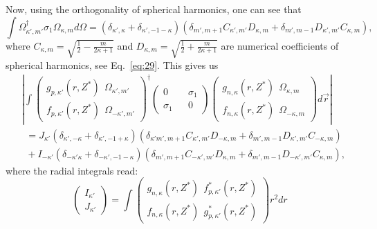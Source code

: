   Now, using the orthogonality of spherical harmonics, one can
  see that
  \begin{equation}
    \int\Omega^{\dagger}_{\kappa',m'}\sigma_1\Omega_{\kappa,m}
    d\Omega=(\delta_{\kappa',\kappa} + \delta_{\kappa',-1-\kappa})
    (\delta_{m',m+1} C_{\kappa',m'} D_{\kappa,m} + \delta_{m',m-1}
    D_{\kappa',m'}C_{\kappa,m}),
  \end{equation}
  where $C_{\kappa,m}= \sqrt{\frac{1}{2} - \frac{m}{2\kappa+1}}$ and
  $D_{\kappa,m} = \sqrt{\frac{1}{2} + \frac{m}{2\kappa+1}}$ are
  numerical coefficients of spherical harmonics, see
  Eq.~\eqref{eq:29}. This gives us
  \begin{align}
    &\left|\int\left(\begin{matrix}
          g_{p,\kappa'}(r,Z^*)~~ \Omega_{\kappa',m'}
          \\
          f_{p,\kappa'}(r,Z^*)~~\Omega_{-\kappa',m'}
        \end{matrix}\right)^{\dagger}\left(\begin{matrix}
          0&&\sigma_1
          \\
          \sigma_1&&0
        \end{matrix}\right)\left(\begin{matrix}
          g_{n,\kappa}(r,Z^*)~~ \Omega_{\kappa,m}
          \\
          f_{n,\kappa}(r,Z^*)~~\Omega_{-\kappa,m}
        \end{matrix}\right)d\vec{r}\right| \nonumber 
    \\
    &~~=J_{\kappa'}(\delta_{\kappa',-\kappa} +
      \delta_{\kappa',-1+\kappa}) (\delta_{\kappa'm',m+1}
      C_{\kappa',m'} D_{-\kappa,m} + \delta_{m',m-1} D_{\kappa',m'}
      C_{-\kappa,m} \nonumber)
    \\
    &~~+I_{-\kappa'}(\delta_{-\kappa'\kappa} +
      \delta_{-\kappa',-1-\kappa}) (\delta_{m',m+1} C_{-\kappa',m'}
      D_{\kappa,m} + \delta_{m',m-1} D_{-\kappa',m'} C_{\kappa,m}),
  \end{align}
  where the radial integrals read:
  \begin{equation}
    \left(\begin{matrix}
        I_{\kappa'}
        \\
        J_{\kappa'}
      \end{matrix}\right)=\int \left(\begin{matrix}
        g_{n,\kappa}(r,Z^*)~~ f^*_{p,\kappa'}(r,Z^*)
        \\
        f_{n,\kappa}(r,Z^*)~~g^*_{p,\kappa'}(r,Z^*)
      \end{matrix}\right) r^2dr
  \end{equation}
